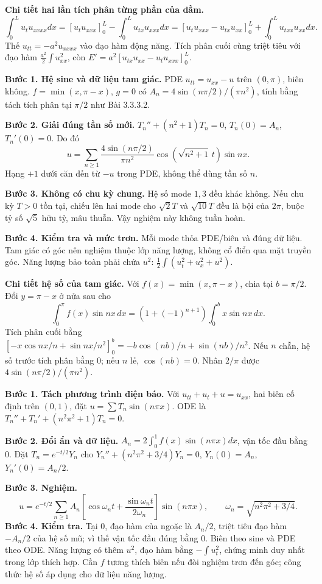 \textbf{Chi tiết hai lần tích phân từng phần của dầm.}
\[\int_0^L u_tu_{xxxx}dx
=[u_tu_{xxx}]_0^L-\int_0^Lu_{tx}u_{xxx}dx
=[u_tu_{xxx}-u_{tx}u_{xx}]_0^L+\int_0^Lu_{txx}u_{xx}dx.\]
Thế $u_{tt}=-a^2u_{xxxx}$ vào đạo hàm động năng. Tích phân cuối cùng triệt tiêu với đạo hàm $\frac{a^2}{2}\int u_{xx}^2$, còn $E'=a^2[u_{tx}u_{xx}-u_tu_{xxx}]_0^L$.

\textbf{Bước 1. Hệ sine và dữ liệu tam giác.} PDE $u_{tt}=u_{xx}-u$ trên $(0,\pi)$, biên không. $f=\min(x,\pi-x)$, $g=0$ có $A_n=4\sin(n\pi/2)/(\pi n^2)$, tính bằng tách tích phân tại $\pi/2$ như Bài 3.3.3.2.

\textbf{Bước 2. Giải đúng tần số mới.} $T_n''+(n^2+1)T_n=0$, $T_n(0)=A_n$, $T_n'(0)=0$. Do đó
\[u=\sum_{n\ge1}\frac{4\sin(n\pi/2)}{\pi n^2}\cos(\sqrt{n^2+1}\,t)\sin nx.\]
Hạng $+1$ dưới căn đến từ $-u$ trong PDE, không thể dùng tần số $n$.

\textbf{Bước 3. Không có chu kỳ chung.} Hệ số mode $1,3$ đều khác không. Nếu chu kỳ $T>0$ tồn tại, chiếu lên hai mode cho $\sqrt2T$ và $\sqrt{10}T$ đều là bội của $2\pi$, buộc tỷ số $\sqrt5$ hữu tỷ, mâu thuẫn. Vậy nghiệm này không tuần hoàn.

\textbf{Bước 4. Kiểm tra và mức trơn.} Mỗi mode thỏa PDE/biên và đúng dữ liệu. Tam giác có góc nên nghiệm thuộc lớp năng lượng, không cổ điển qua mặt truyền góc. Năng lượng bảo toàn phải chứa $u^2$: $\frac12\int(u_t^2+u_x^2+u^2)$.

\textbf{Chi tiết hệ số của tam giác.} Với $f(x)=\min(x,\pi-x)$, chia tại $b=\pi/2$. Đổi $y=\pi-x$ ở nửa sau cho
\[\int_0^\pi f(x)\sin nx\,dx=(1+(-1)^{n+1})\int_0^b x\sin nx\,dx.\]
Tích phân cuối bằng $[-x\cos nx/n+\sin nx/n^2]_0^b=-b\cos(nb)/n+\sin(nb)/n^2$. Nếu $n$ chẵn, hệ số trước tích phân bằng $0$; nếu $n$ lẻ, $\cos(nb)=0$. Nhân $2/\pi$ được $4\sin(n\pi/2)/(\pi n^2)$.

\textbf{Bước 1. Tách phương trình điện báo.} Với $u_{tt}+u_t+u=u_{xx}$, hai biên cố định trên $(0,1)$, đặt $u=\sum T_n\sin(n\pi x)$. ODE là $T_n''+T_n'+(n^2\pi^2+1)T_n=0$.

\textbf{Bước 2. Đổi ẩn và dữ liệu.} $A_n=2\int_0^1f(x)\sin(n\pi x)dx$, vận tốc đầu bằng $0$. Đặt $T_n=e^{-t/2}Y_n$ cho $Y_n''+(n^2\pi^2+3/4)Y_n=0$, $Y_n(0)=A_n$, $Y_n'(0)=A_n/2$.

\textbf{Bước 3. Nghiệm.}
\[u=e^{-t/2}\sum_{n\ge1}A_n\left[\cos\omega_nt+\frac{\sin\omega_nt}{2\omega_n}\right]\sin(n\pi x),\qquad\omega_n=\sqrt{n^2\pi^2+3/4}.\]
\textbf{Bước 4. Kiểm tra.} Tại $0$, đạo hàm của ngoặc là $A_n/2$, triệt tiêu đạo hàm $-A_n/2$ của hệ số mũ; vì thế vận tốc đầu đúng bằng $0$. Biên theo sine và PDE theo ODE. Năng lượng có thêm $u^2$, đạo hàm bằng $-\int u_t^2$, chứng minh duy nhất trong lớp thích hợp. Cần $f$ tương thích biên nếu đòi nghiệm trơn đến góc; công thức hệ số áp dụng cho dữ liệu năng lượng.

